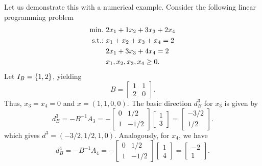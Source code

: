Let us demonstrate this with a numerical example. Consider the following linear programming problem
%
\begin{align*}
	\mathop{\text{min.~}} & 2x_1 + 1x_2 + 3x_3 + 2x_4 \\	
	\mathop{\text{s.t.:~}} & x_1 + x_2 + x_3 + x_4 = 2 \\
	& 2x_1 + 3x_3 + 4x_4 = 2 \\
	& x_1, x_2 ,x_3, x_4 \geq 0.  
\end{align*}  
%
Let $I_B = \left\{ 1,2 \right \}$, yielding
% 
\begin{equation*}
	B = \begin{bmatrix}
    		1 & 1 \\
    		2 & 0
    	\end{bmatrix}.
\end{equation*} 
%
Thus, $x_3= x_4 =0$ and $x = (1,1,0,0)$. The basic direction $d_B^3$ for $x_3$ is given by
%
\begin{equation*}
    d_B^3 = -B^{-1}A_3 = -\begin{bmatrix}
    	0 & 1/2 \\
    	1 & -1/2
    \end{bmatrix} \begin{bmatrix}
    	1 \\ 3
    \end{bmatrix} = \begin{bmatrix}
    	-3/2 \\ 1/2
    \end{bmatrix}.
\end{equation*}
%
which gives $d^3 = (-3/2, 1/2, 1, 0)$. Analogously, for $x_4$, we have
%
\begin{equation*}
    d_B^4 = -B^{-1}A_4 = -\begin{bmatrix}
    	0 & 1/2 \\
    	1 & -1/2
    \end{bmatrix} \begin{bmatrix}
    	1 \\ 4
    \end{bmatrix} = \begin{bmatrix}
    	-2 \\ 1
    \end{bmatrix}.
\end{equation*}


